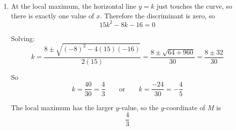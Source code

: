 \documentclass[leqno]{article}
\begin{document}
\begin{enumerate}[
  label=\textbf{\arabic*.},
  leftmargin=*,
  topsep=0pt,
  partopsep=0pt,
  parsep=0pt
]
\begin{djsSolution}
\begin{enumerate}[label=\textbf{(\alph*)}]
\begin{enumerate}[label=(\roman*)]
    when
    \[
    k=\frac{x^2+2x-3}{x^2-x+4}
    \]

    First note that
    \[
    x^2-x+4=\left(x-\frac12\right)^2+\frac{15}{4}>0
    \]

    for all real $x$, so we may multiply through safely.

    Hence
    \[
    x^2+2x-3=k(x^2-x+4)
    \]

    Rearranging:
    \begin{align*}
    x^2+2x-3 &= kx^2-kx+4k \\
    0 &= kx^2-kx+4k-x^2-2x+3 \\
    0 &= (k-1)x^2-(k+2)x+(4k+3)
    \end{align*}

    Equivalently:
    \[
    (1-k)x^2+(2+k)x-(3+4k)=0
    \]

    For the line to intersect the curve, this quadratic in $x$ must have at least one real root. So its discriminant is non-negative:
    \[
    (2+k)^2-4(1-k)\bigl(-(3+4k)\bigr)\ge 0
    \]

    Now expand:
    \begin{align*}
    (2+k)^2+4(1-k)(3+4k) &\ge 0 \\
    (k^2+4k+4)+4(3+4k-3k-4k^2) &\ge 0 \\
    k^2+4k+4+4(3+k-4k^2) &\ge 0 \\
    k^2+4k+4+12+4k-16k^2 &\ge 0 \\
    -15k^2+8k+16 &\ge 0
    \end{align*}

    Therefore
    \[
    15k^2-8k-16\le 0
    \]

    as required.

    \item At the local maximum, the horizontal line $y=k$ just touches the curve, so there is exactly one value of $x$. Therefore the discriminant is zero, so
    \[
    15k^2-8k-16=0
    \]

    Solving:
    \[
    k=\frac{8\pm\sqrt{(-8)^2-4(15)(-16)}}{2(15)}
    =\frac{8\pm\sqrt{64+960}}{30}
    =\frac{8\pm 32}{30}
    \]

    So
    \[
    k=\frac{40}{30}=\frac43
    \qquad \text{or} \qquad
    k=\frac{-24}{30}=-\frac45
    \]

    The local maximum has the larger $y$-value, so the $y$-coordinate of $M$ is
    \[
    \frac43
    \]
  \end{enumerate}
\end{enumerate}
\end{djsSolution}



\end{enumerate}
\end{document}
